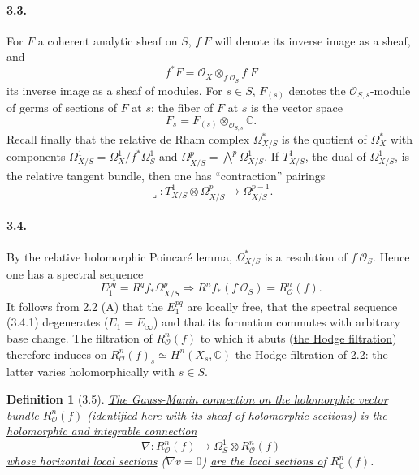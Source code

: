 \documentclass[10pt,leqno]{article}
\newcommand{\C}{\mathbb C}
\newcommand{\cO}{\mathcal O}
\theoremstyle{deligne}
\newtheorem*{definition}{Definition}
\renewcommand{\underline}[1]{\uline{#1}}
\begin{document}
\paragraph{3.3.}
For $F$ a coherent analytic sheaf on $S$, $f^\cdot F$ will denote its inverse image as a sheaf, and
\[
f^*F=\cO_X\otimes_{f^\cdot\cO_S}f^\cdot F
\]
its inverse image as a sheaf of modules. For $s\in S$, $F_{(s)}$ denotes the $\cO_{S,s}$-module of germs of sections of $F$ at $s$; the fiber of $F$ at $s$ is the vector space
\[
F_s=F_{(s)}\otimes_{\cO_{S,s}}\C .
\]
Recall finally that the relative de Rham complex $\Omega_{X/S}^*$ is the quotient of $\Omega_X^*$ with components $\Omega^1_{X/S}=\Omega_X^1/f^*\Omega_S^1$ and $\Omega^p_{X/S}=\bigwedge^p\Omega_{X/S}^1$.
If $T^1_{X/S}$, the dual of $\Omega^1_{X/S}$, is the relative tangent bundle, then one has ``contraction'' pairings
\begin{equation}
\lrcorner:T^1_{X/S}\otimes\Omega^p_{X/S}\longrightarrow\Omega^{p-1}_{X/S}.
\tag{3.3.1}
\end{equation}

\paragraph{3.4.}
By the relative holomorphic Poincaré lemma, $\Omega_{X/S}^*$ is a resolution of $f^\cdot\cO_S$. Hence one has a spectral sequence
\begin{equation}
E_1^{pq}=R^qf_*\Omega^p_{X/S}\Rightarrow R^n f_*(f^\cdot\cO_S)=R_\cO^n(f).
\tag{3.4.1}
\end{equation}
It follows from 2.2 (A) that the $E_1^{pq}$ are locally free, that the spectral sequence (3.4.1) degenerates ($E_1=E_\infty$) and that its formation commutes with arbitrary base change. The filtration of $R_\cO^n(f)$ to which it abuts (\underline{the Hodge filtration}) therefore induces on $R_\cO^n(f)_s\simeq H^n(X_s,\C)$ the Hodge filtration of 2.2: the latter varies holomorphically with $s\in S$.

\begin{definition}[3.5]
\underline{The Gauss-Manin connection on the holomorphic vector bundle} $R_\cO^n(f)$ (\underline{identified here with its sheaf of holomorphic sections}) \underline{is the holomorphic and integrable connection}
\[
\nabla:R_\cO^n(f)\longrightarrow\Omega_S^1\otimes R_\cO^n(f)
\]
\underline{whose horizontal local sections} ($\nabla v=0$) \underline{are the local sections of} $R_\C^n(f)$.
\end{definition}
\end{document}
